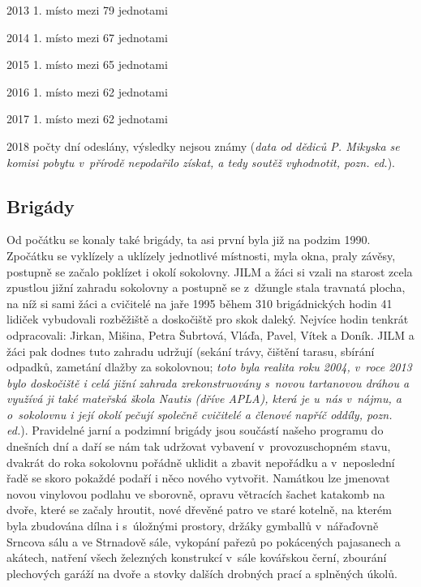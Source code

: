 \documentclass[a5paper, 12pt, twoside]{article}
\begin{document}
2013 1. místo mezi 79 jednotami

2014 1. místo mezi 67 jednotami

2015 1. místo mezi 65 jednotami

2016 1. místo mezi 62 jednotami

2017 1. místo mezi 62 jednotami

2018 počty dní odeslány, výsledky nejsou známy (\textit{data od dědiců P.
Mikyska se komisi pobytu v~přírodě nepodařilo získat, a tedy soutěž
vyhodnotit, pozn. ed.}).

\subsection{Brigády}

Od počátku se konaly také brigády, ta asi první byla již na podzim 1990.
Zpočátku se vyklízely a uklízely jednotlivé místnosti, myla okna, praly
závěsy, postupně se začalo poklízet i okolí sokolovny. JILM a žáci si
vzali na starost zcela zpustlou jižní zahradu sokolovny a postupně se
z~džungle stala travnatá plocha, na níž si sami žáci a cvičitelé na jaře
1995 během 310 brigádnických hodin 41 lidiček vybudovali rozběžiště a
doskočiště pro skok daleký. Nejvíce hodin tenkrát odpracovali: Jirkan,
Mišina, Petra Šubrtová, Vláďa, Pavel, Vítek a Doník. JILM a žáci pak
dodnes tuto zahradu udržují (sekání trávy, čištění tarasu, sbírání
odpadků, zametání dlažby za sokolovnou; \textit{toto byla realita roku
2004, v~roce 2013 bylo doskočiště i celá jižní zahrada zrekonstruovány
s~novou tartanovou dráhou a využívá ji také mateřská škola Nautis (dříve
APLA), která je u~nás v~nájmu, a o~sokolovnu i její okolí pečují
společně cvičitelé a členové napříč oddíly, pozn. ed.}). Pravidelné
jarní a podzimní brigády jsou součástí našeho programu do dnešních dní a
daří se nám tak udržovat vybavení v~provozuschopném stavu, dvakrát do
roka sokolovnu pořádně uklidit a zbavit nepořádku a v~neposlední řadě se
skoro pokaždé podaří i něco nového vytvořit. Namátkou lze jmenovat novou
vinylovou podlahu ve sborovně, opravu větracích šachet katakomb na
dvoře, které se začaly hroutit, nové dřevěné patro ve staré kotelně, na
kterém byla zbudována dílna i s~úložnými prostory, držáky gymballů
v~nářaďovně Srncova sálu a ve Strnadově sále, vykopání pařezů po
pokácených pajasanech a akátech, natření všech železných konstrukcí
v~sále kovářskou černí, zbourání plechových garáží na dvoře a stovky
dalších drobných prací a splněných úkolů.

\end{document}
